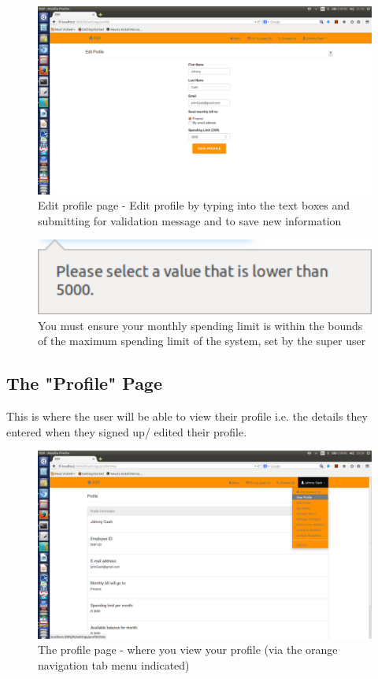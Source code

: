 \documentclass[a4paper,12pt]{article}
\begin{document}
\begin{figure}[H]
  \centering
    \includegraphics[width=1.0\textwidth]{screenshots/editProfile.png}
    \caption{Edit profile page - Edit profile by typing into the text boxes and submitting for validation message and to save new information } 
\end{figure}

\begin{figure}[H]
  \centering
    \includegraphics[width=1.0\textwidth]{screenshots/limitExeeds.png}
    \caption{You must ensure your monthly spending limit is within the bounds of the maximum spending limit of the system, set by the super user} 
\end{figure}

\subsection{The "Profile" Page} 
This is where the user will be able to view their profile i.e. the details they entered when they signed up/ edited their profile. 

\begin{figure}[H]
  \centering
    \includegraphics[width=1.0\textwidth]{screenshots/viewProfile.png}
    \caption{The profile page - where you view your profile (via the orange navigation tab menu indicated)} 
\end{figure}
\end{document}
